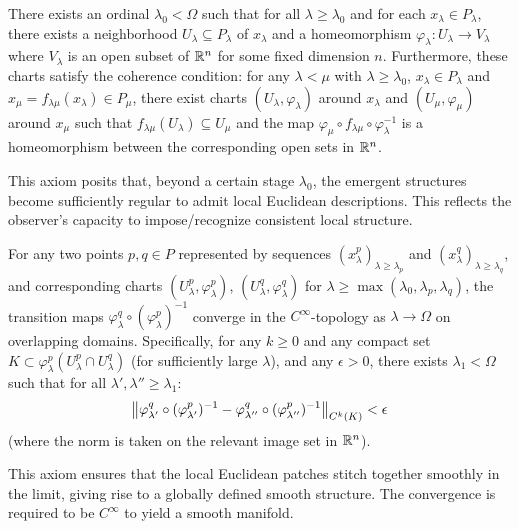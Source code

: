 \begin{axiom}
\label{axiom:bk1_local_charitability}
There exists an ordinal $\lambda_0 < \Omega$ such that for all $\lambda \geq \lambda_0$ and for each $x_\lambda \in P_\lambda$, there exists a neighborhood $U_\lambda \subseteq P_\lambda$ of $x_\lambda$ and a homeomorphism $\varphi_\lambda: U_\lambda \to V_\lambda$ where $V_\lambda$ is an open subset of $\mathbb{R}^n$ for some fixed dimension $n$.
Furthermore, these charts satisfy the coherence condition: for any $\lambda < \mu$ with $\lambda \ge \lambda_0$, $x_\lambda \in P_\lambda$ and $x_\mu = f_{\lambda\mu}(x_\lambda) \in P_\mu$, there exist charts $(U_\lambda, \varphi_\lambda)$ around $x_\lambda$ and $(U_\mu, \varphi_\mu)$ around $x_\mu$ such that $f_{\lambda\mu}(U_\lambda) \subseteq U_\mu$ and the map $\varphi_\mu \circ f_{\lambda\mu} \circ \varphi_\lambda^{-1}$ is a homeomorphism between the corresponding open sets in $\mathbb{R}^n$.
\end{axiom}
\begin{remark}
This axiom posits that, beyond a certain stage $\lambda_0$, the emergent structures become sufficiently regular to admit local Euclidean descriptions. This reflects the observer's capacity to impose/recognize consistent local structure.
\end{remark}
\begin{axiom}
\label{axiom:bk1_smooth_convergence}
For any two points $p, q \in P$ represented by sequences $(x_\lambda^p)_{\lambda \ge \lambda_p}$ and $(x_\lambda^q)_{\lambda \ge \lambda_q}$, and corresponding charts $(U_\lambda^p, \varphi_\lambda^p)$, $(U_\lambda^q, \varphi_\lambda^q)$ for $\lambda \ge \max(\lambda_0, \lambda_p, \lambda_q)$, the transition maps $\varphi_\lambda^q \circ (\varphi_\lambda^p)^{-1}$ converge in the $C^\infty$-topology as $\lambda \to \Omega$ on overlapping domains.
Specifically, for any $k \ge 0$ and any compact set $K \subset \varphi_\lambda^p(U_\lambda^p \cap U_\lambda^q)$ (for sufficiently large $\lambda$), and any $\epsilon > 0$, there exists $\lambda_1 < \Omega$ such that for all $\lambda', \lambda'' \ge \lambda_1$:
\[
\left\| \varphi_{\lambda'}^q \circ (\varphi_{\lambda'}^p)^{-1} - \varphi_{\lambda''}^q \circ (\varphi_{\lambda''}^p)^{-1} \right\|_{C^k(K)} < \epsilon
\]
(where the norm is taken on the relevant image set in $\mathbb{R}^n$).
\end{axiom}
\begin{remark}
This axiom ensures that the local Euclidean patches stitch together smoothly in the limit, giving rise to a globally defined smooth structure. The convergence is required to be $C^\infty$ to yield a smooth manifold.
\end{remark}
